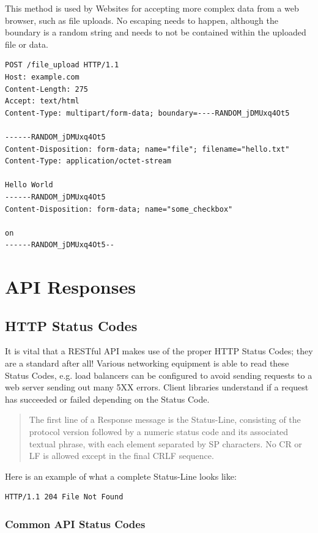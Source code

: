 \documentclass{book}
\begin{document}
This method is used by Websites for accepting more complex data from a web browser, such as file uploads. No escaping needs to happen, although the boundary is a random string and needs to not be contained within the uploaded file or data.

\begin{verbatim}
POST /file_upload HTTP/1.1
Host: example.com
Content-Length: 275
Accept: text/html
Content-Type: multipart/form-data; boundary=----RANDOM_jDMUxq4Ot5

------RANDOM_jDMUxq4Ot5
Content-Disposition: form-data; name="file"; filename="hello.txt"
Content-Type: application/octet-stream

Hello World
------RANDOM_jDMUxq4Ot5
Content-Disposition: form-data; name="some_checkbox"

on
------RANDOM_jDMUxq4Ot5--
\end{verbatim}


\chapter{API Responses}

\section{HTTP Status Codes}

It is vital that a RESTful API makes use of the proper HTTP Status Codes; they are a standard after all! Various networking equipment is able to read these Status Codes, e.g. load balancers can be configured to avoid sending requests to a web server sending out many 5XX errors. Client libraries understand if a request has succeeded or failed depending on the Status Code.

\begin{quote}
The first line of a Response message is the Status-Line, consisting of the protocol version followed by a numeric status code and its associated textual phrase, with each element separated by SP characters. No CR or LF is allowed except in the final CRLF sequence.\cite{RFC2616}
\end{quote}

Here is an example of what a complete Status-Line looks like:

\begin{verbatim}
HTTP/1.1 204 File Not Found
\end{verbatim}

\subsection{Common API Status Codes}
\end{document}
